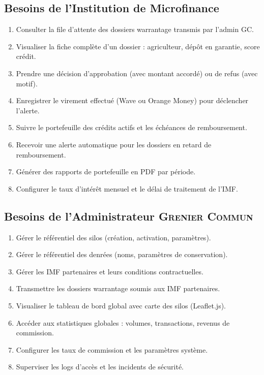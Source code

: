 \documentclass[12pt,a4paper,twoside]{report}
\newcommand{\gc}{\textsc{Grenier Commun}}
\begin{document}
\subsection{Besoins de l'Institution de Microfinance}

\begin{enumerate}[label=\textbf{BF-I\arabic*}]
  \item Consulter la file d'attente des dossiers warrantage transmis par l'admin GC.
  \item Visualiser la fiche complète d'un dossier : agriculteur, dépôt en garantie, score crédit.
  \item Prendre une décision d'approbation (avec montant accordé) ou de refus (avec motif).
  \item Enregistrer le virement effectué (Wave ou Orange Money) pour déclencher l'alerte.
  \item Suivre le portefeuille des crédits actifs et les échéances de remboursement.
  \item Recevoir une alerte automatique pour les dossiers en retard de remboursement.
  \item Générer des rapports de portefeuille en PDF par période.
  \item Configurer le taux d'intérêt mensuel et le délai de traitement de l'IMF.
\end{enumerate}

\subsection{Besoins de l'Administrateur \gc{}}

\begin{enumerate}[label=\textbf{BF-AD\arabic*}]
  \item Gérer le référentiel des silos (création, activation, paramètres).
  \item Gérer le référentiel des denrées (noms, paramètres de conservation).
  \item Gérer les IMF partenaires et leurs conditions contractuelles.
  \item Transmettre les dossiers warrantage soumis aux IMF partenaires.
  \item Visualiser le tableau de bord global avec carte des silos (Leaflet.js).
  \item Accéder aux statistiques globales : volumes, transactions, revenus de commission.
  \item Configurer les taux de commission et les paramètres système.
  \item Superviser les logs d'accès et les incidents de sécurité.
\end{enumerate}
\end{document}
